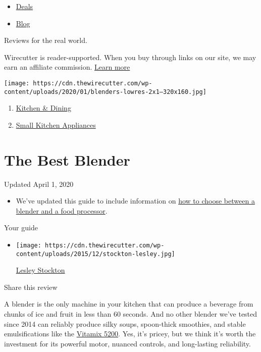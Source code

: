 \begin{itemize}
\tightlist
\item
  \href{/wirecutter/deals/}{Deals}
\item
  \href{/wirecutter/blog/}{Blog}
\end{itemize}

Reviews for the real world.

Wirecutter is reader-supported. When you buy through links on our site,
we may earn an affiliate commission. \href{/wirecutter/about/}{Learn
more}

\texttt{[image: https://cdn.thewirecutter.com/wp-content/uploads/2020/01/blenders-lowres-2x1--320x160.jpg]}

\begin{enumerate}
\def\labelenumi{\arabic{enumi}.}
\tightlist
\item
  \href{/wirecutter/kitchen-dining/}{Kitchen \& Dining}
\item
  \href{/wirecutter/kitchen-dining/small-appliances/}{Small Kitchen
  Appliances}
\end{enumerate}

\hypertarget{the-best-blender}{%
\section{The Best Blender}\label{the-best-blender}}

Updated April 1, 2020

\begin{itemize}
\tightlist
\item
  We've updated this guide to include information on
  \protect\hyperlink{blender-vs-food-processor-which-one-should-you-get}{how
  to choose between a blender and a food processor}.
\end{itemize}

Your guide

\begin{itemize}
\item
  \texttt{[image: https://cdn.thewirecutter.com/wp-content/uploads/2015/12/stockton-lesley.jpg]}

  \href{https://www.nytimes3xbfgragh.onion/wirecutter/authors/lesley-stockton/}{Lesley
  Stockton}
\end{itemize}

Share this review

A blender is the only machine in your kitchen that can produce a
beverage from chunks of ice and fruit in less than 60 seconds. And no
other blender we've tested since 2014 can reliably produce silky soups,
spoon-thick smoothies, and stable emulsifications like the
\href{https://www.nytimes3xbfgragh.onion/wirecutter/out/link/7761/112178/4/69782/?merchant=Amazon}{Vitamix
5200}. Yes, it's pricey, but we think it's worth the investment for its
powerful motor, nuanced controls, and long-lasting reliability.

